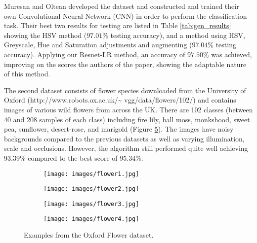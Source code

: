 \documentclass[conference]{IEEEtran}
\begin{document}
Muresan and Oltean \cite{muresan} developed the dataset and constructed and trained their own Convolutional Neural Network (CNN) in order to perform the classification task. Their best two results for testing are listed in Table \ref{tab:gen_results} showing the HSV method ($97.01\%$ testing accuracy), and a method using HSV, Greyscale, Hue and Saturation adjustments and augmenting ($97.04\%$ testing accuracy). Applying our Resnet-LR method, an accuracy of $97.50\%$ was achieved, improving on the scores the authors of the paper, showing the adaptable nature of this method.

The second dataset consists of flower species downloaded from the University of Oxford (http://www.robots.ox.ac.uk/\textasciitilde{} vgg/data/flowers/102/) and contains images of various wild flowers from across the UK. There are 102 classes (between 40 and 208 samples of each class) including fire lily, ball moss, monkshood, sweet pea, sunflower, desert-rose, and marigold (Figure \ref{fig:flowers}). The images have noisy backgrounds compared to the previous datasets as well as varying illumination, scale and occlusions. However, the algorithm still performed quite well achieving 93.39\% compared to the best score of 95.34\%.

\begin{figure}[ht]
	\centering
	\begin{subfigure}{0.45\linewidth}
		\centering
		\texttt{[image: images/flower1.jpg]}
		\caption{}
		\label{fig:fl1}
	\end{subfigure}%
	\begin{subfigure}{0.45\linewidth}
		\centering
		\texttt{[image: images/flower2.jpg]}
		\caption{}
		\label{fig:fl2}
	\end{subfigure}%
	
	\begin{subfigure}{0.45\linewidth}
		\centering
		\texttt{[image: images/flower3.jpg]}
		\caption{}
		\label{fig:fl3}
	\end{subfigure}%
	\begin{subfigure}{0.45\linewidth}
		\centering
		\texttt{[image: images/flower4.jpg]}
		\caption{}
		\label{fig:fl4}
	\end{subfigure}%
	
	\caption{Examples from the Oxford Flower dataset.}
	\label{fig:flowers}
\end{figure}
\end{document}

